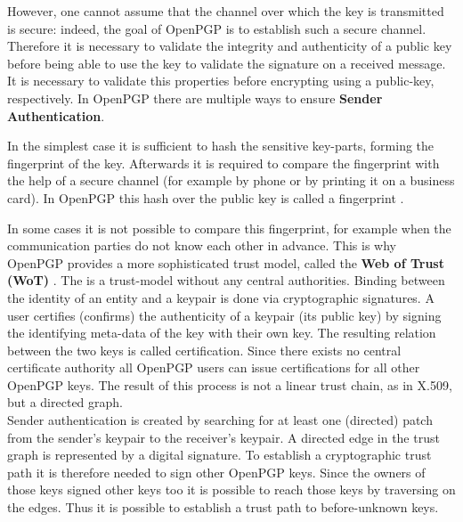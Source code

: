 
However, one cannot assume that the channel over which the key is transmitted is
secure: indeed, the goal of OpenPGP is to establish such a secure channel.
Therefore it is necessary to validate the integrity and authenticity of a public key before being able to use the key to validate the signature on a received message. It is necessary to validate this properties before encrypting using a public-key, respectively. In OpenPGP there are multiple ways to ensure \textbf{Sender Authentication}.

In the simplest case it is sufficient to hash the sensitive key-parts, forming the fingerprint of the key. Afterwards it is required to compare the fingerprint with the help of a secure channel (for example by phone or by printing it on a business card). In OpenPGP this hash over the public key is called a fingerprint \cite[section 12]{RFC4880}.


In some cases it is not possible to compare this fingerprint, for example when the communication parties do not know each other in advance. This is why OpenPGP provides a more sophisticated trust model, called the \textbf{Web of Trust (WoT)} \cite{PGP2manual}. The  is a trust-model without any central authorities. Binding between the identity of an entity and a keypair is done via cryptographic signatures. A user certifies (confirms) the authenticity of a keypair (its public key) by signing the identifying meta-data of the key with their own key. The resulting relation between the two keys is called certification. Since there exists no central certificate authority all OpenPGP users can issue certifications for all other OpenPGP keys. The result of this process is not a linear trust chain, as in X.509, but a directed graph. \\


Sender authentication is created by searching for at least one (directed) patch from the sender's keypair to the receiver's keypair. A directed edge in the trust graph is represented by a digital signature. To establish a cryptographic trust path it is therefore needed to sign other OpenPGP keys. Since the owners of those keys signed other keys too it is possible to reach those keys by traversing on the edges. Thus it is possible to establish a trust path to before-unknown keys.


